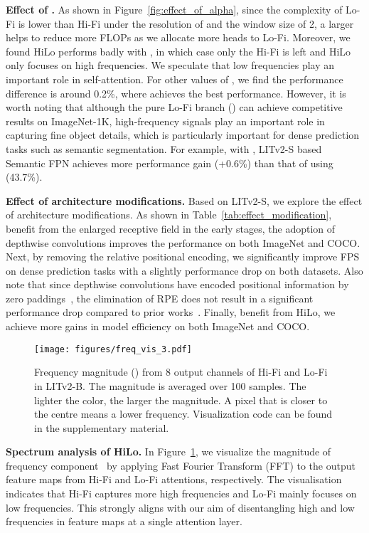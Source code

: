 \textbf{Effect of .}
As shown in Figure~\ref{fig:effect_of_alpha}, since the complexity of Lo-Fi is lower than Hi-Fi under the resolution of  and the window size of 2, a larger  helps to reduce more FLOPs as we allocate more heads to Lo-Fi. Moreover, we found HiLo performs badly with , in which case only the Hi-Fi is left and HiLo only focuses on high frequencies. We speculate that low frequencies play an important role in self-attention. For other values of , we find the performance difference is around 0.2\%, where  achieves the best performance. However, it is worth noting that although the pure Lo-Fi branch () can achieve competitive results on ImageNet-1K, high-frequency signals play an important role in capturing fine object details, which is particularly important for  dense prediction tasks such as semantic segmentation. For example, with , LITv2-S based Semantic FPN achieves more performance gain (+0.6\%) than that of using  (43.7\%).

\textbf{Effect of architecture modifications.} Based on LITv2-S, we explore the effect of architecture modifications. As shown in Table~\ref{tab:effect_modification}, benefit from the enlarged receptive field in the early stages, the adoption of depthwise convolutions improves the performance on both ImageNet and COCO. Next, by removing the relative positional encoding, we significantly improve FPS on dense prediction tasks with a slightly performance drop on both datasets. Also note that since depthwise convolutions have encoded positional information by zero paddings~\cite{cnn_pos_encoding}, the elimination of RPE does not result in a significant performance drop compared to prior works~\cite{swin}. Finally, benefit from HiLo, we achieve more gains in model efficiency on both ImageNet and COCO.

\begin{figure}[]
	\centering
	\texttt{[image: figures/freq\_vis\_3.pdf]}
	\vspace{-3mm}
	\caption{Frequency magnitude () from 8 output channels of Hi-Fi and Lo-Fi in LITv2-B. The magnitude is averaged over 100 samples. The lighter the color, the larger the magnitude. A pixel that is closer to the centre means a lower frequency. Visualization code can be found in the supplementary material.
 }
	\label{fig:vis_freq}
	\vspace{-7mm}
\end{figure}

\textbf{Spectrum analysis of HiLo.} 
In Figure~\ref{fig:vis_freq}, we visualize the magnitude of frequency component~\cite{rao2021global} by applying Fast Fourier Transform (FFT) to the output feature maps from Hi-Fi and Lo-Fi attentions, respectively. The visualisation indicates that Hi-Fi captures more high frequencies and Lo-Fi mainly focuses on low frequencies. This strongly aligns with our aim of disentangling high and low frequencies in feature maps at a single attention layer. 

